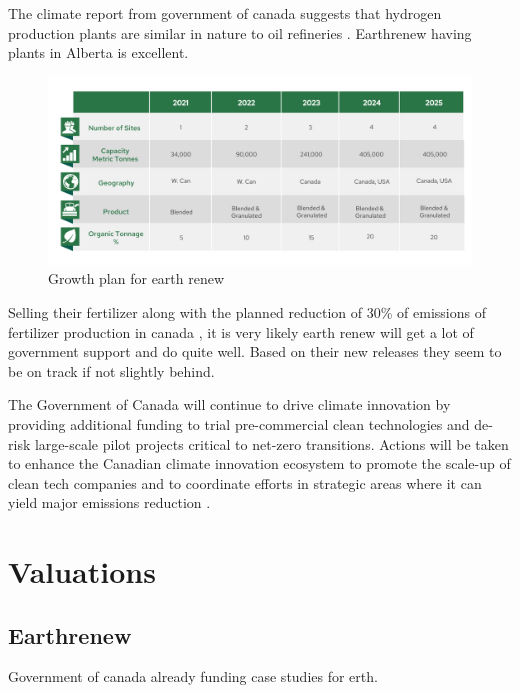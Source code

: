 The climate report from government of canada suggests that hydrogen production plants are similar in nature to oil refineries \cite{climate_change_2030_emissions}. Earthrenew having plants in Alberta is excellent.


\begin{figure}[h]
\includegraphics[width=\textwidth]{src/media/63894524-04fe-485b-a801-736431092c3c-e1633360733920.png}
\caption{Growth plan for earth renew}
\end{figure}

Selling their fertilizer along with the planned reduction of 30\% of emissions of fertilizer production in canada \cite{climate_change_2030_emissions}, it is very likely earth renew will get a lot of government support and do quite well. Based on their new releases they seem to be on track if not slightly behind.


\begin{blockquote}
The Government of Canada will continue to drive climate innovation by providing additional funding to
trial pre-commercial clean technologies and de-risk large-scale pilot projects critical to net-zero
transitions. Actions will be taken to enhance the Canadian climate innovation ecosystem to promote the
scale-up of clean tech companies and to coordinate efforts in strategic areas where it can yield major
emissions reduction \cite{climate_change_2030_emissions}. 
\end{blockquote}


\chapter{Valuations}

\section{Earthrenew}
Government of canada already funding case studies for erth.

